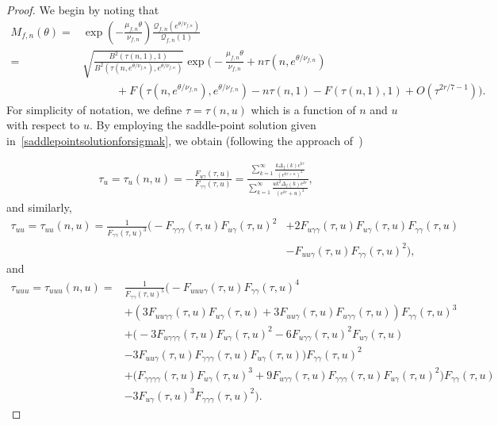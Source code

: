 \documentclass[12pt, oneside,reqno]{amsart}
\numberwithin{equation}{section}
\begin{document}
\begin{proof}
We begin by noting that
\begin{align}\label{asymtoticsofmomentgeneratingfunction}
M_{f,n}(\theta)
=&\exp\left(-\frac{\mu_{f,n}\theta}{\nu_{f,n}}\right)\frac{\mathcal{Q}_{f,n}(e^{\theta/\nu_{f,n}})}{\mathcal{Q}_{f,n}(1)}\nonumber\\
=&\sqrt{\frac{B^2(\tau(n,1),1)}{B^2(\tau(n,e^{\theta/\nu_{f,n}}),e^{\theta/\nu_{f,n}})}}\exp\Bigg(-\frac{\mu_{f,n}\theta}{\nu_{f,n}}+n\tau(n,e^{\theta/\nu_{f,n}})\nonumber\\
&\quad\quad\quad+{F}(\tau(n,e^{\theta/\nu_{f,n}}),e^{\theta/\nu_{f,n}})-n\tau(n,1)-{F}(\tau(n,1),1)+O(\tau^{2r/7-1})\Bigg).
\end{align}
\noindent
For simplicity of notation, we define $\tau=\tau(n,u)$ which is a function of $n$ and $u$ with respect to $u$. By employing the saddle-point solution given in~\eqref{saddlepointsolutionforsigmak}, we obtain (following the approach of~\cite{madwag})

\begin{align*}
\tau_u
=\tau_{u}(n,u)
=-\frac{{F}_{u\gamma}(\tau,u)}{{F}_{\gamma\gamma}(\tau,u)}
=\frac{\sum_{k=1}^{\infty}\frac{k\Delta_f(k)e^{k\tau}}{(e^{k\tau+u})^2}}{\sum_{k=1}^{\infty}\frac{uk^2\Delta_f(k)e^{kr}}{(e^{kr}+u)^2}},
\end{align*}
and similarly,
\begin{align*}
\tau_{uu}=\tau_{uu}(n,u)
=\frac{1}{{F}_{\gamma\gamma}(\tau,u)^3}\big(-{F}_{\gamma\gamma\gamma}(\tau,u){F}_{u\gamma}(\tau,u)^2
&+2{F}_{u\gamma\gamma}(\tau,u){F}_{u\gamma}(\tau,u){F}_{\gamma\gamma}(\tau,u)\\
&-{F}_{uu\gamma}(\tau,u){F}_{\gamma\gamma}(\tau,u)^2\big),
\end{align*}
and
\begin{align*}
\tau_{uuu}=\tau_{uuu}(n,u)
=&\frac{1}{{F}_{\gamma\gamma}(\tau,u)^5}\big(-{F}_{uuu\gamma}(\tau,u){F}_{\gamma\gamma}(\tau,u)^4\\
&+(3{F}_{uu\gamma\gamma}(\tau,u){F}_{u\gamma}(\tau,u)+3{F}_{uu\gamma}(\tau,u){F}_{u\gamma\gamma}(\tau,u)){F}_{\gamma\gamma}(\tau,u)^3\\
&+\big(-3{F}_{u\gamma\gamma\gamma}(\tau,u){F}_{u\gamma}(\tau,u)^2-6{F}_{u\gamma\gamma}(\tau,u)^2{F}_{u\gamma}(\tau,u)\\
&-3{F}_{uu\gamma}(\tau,u){F}_{\gamma\gamma\gamma}(\tau,u){F}_{u\gamma}(\tau,u)\big)F_{\gamma\gamma}(\tau,u)^2\\
&+\big({F}_{\gamma\gamma\gamma\gamma}(\tau,u){F}_{u\gamma}(\tau,u)^3+9{F}_{u\gamma\gamma}(\tau,u){F}_{\gamma\gamma\gamma}(\tau,u){F}_{u\gamma}(\tau,u)^2\big){F}_{\gamma\gamma}(\tau,u)\\
&-3{F}_{u\gamma}(\tau,u)^3{F}_{\gamma\gamma\gamma}(\tau,u)^2\big).
\end{align*}


\end{proof}
\end{document}
